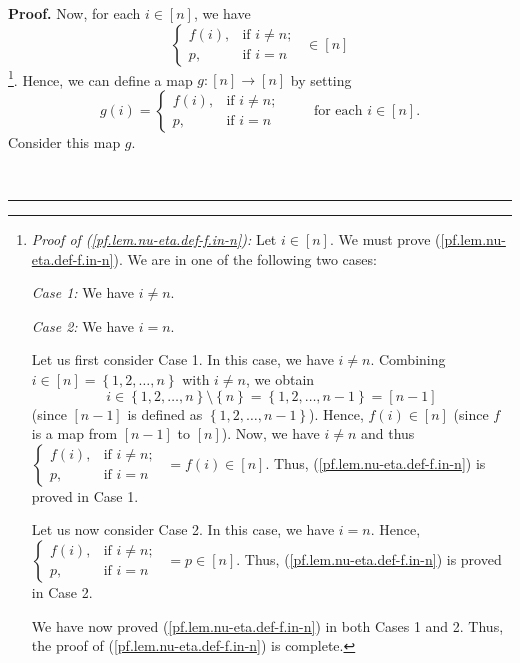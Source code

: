 \documentclass
[numbers=enddot,12pt,final,onecolumn,notitlepage,english]{scrartcl}%
\theoremstyle{definition}
\newenvironment{proof}[1][Proof]{\noindent\textbf{#1.} }{\ \rule{0.5em}{0.5em}}
\newenvironment{verlong}{}{}
\begin{document}
\begin{verlong}
\begin{proof}
Now, for each $i\in\left[  n\right]  $, we have%
\begin{equation}%
\begin{cases}
f\left(  i\right)  , & \text{if }i\neq n;\\
p, & \text{if }i=n
\end{cases}
\ \ \in\left[  n\right]  \label{pf.lem.nu-eta.def-f.in-n}%
\end{equation}
\footnote{\textit{Proof of (\ref{pf.lem.nu-eta.def-f.in-n}):} Let $i\in\left[
n\right]  $. We must prove (\ref{pf.lem.nu-eta.def-f.in-n}). We are in one of
the following two cases:
\par
\textit{Case 1:} We have $i\neq n$.
\par
\textit{Case 2:} We have $i=n$.
\par
Let us first consider Case 1. In this case, we have $i\neq n$. Combining
$i\in\left[  n\right]  =\left\{  1,2,\ldots,n\right\}  $ with $i\neq n$, we
obtain%
\[
i\in\left\{  1,2,\ldots,n\right\}  \setminus\left\{  n\right\}  =\left\{
1,2,\ldots,n-1\right\}  =\left[  n-1\right]
\]
(since $\left[  n-1\right]  $ is defined as $\left\{  1,2,\ldots,n-1\right\}
$). Hence, $f\left(  i\right)  \in\left[  n\right]  $ (since $f$ is a map from
$\left[  n-1\right]  $ to $\left[  n\right]  $). Now, we have $i\neq n$ and
thus $%
\begin{cases}
f\left(  i\right)  , & \text{if }i\neq n;\\
p, & \text{if }i=n
\end{cases}
\ \ =f\left(  i\right)  \in\left[  n\right]  $. Thus,
(\ref{pf.lem.nu-eta.def-f.in-n}) is proved in Case 1.
\par
Let us now consider Case 2. In this case, we have $i=n$. Hence, $%
\begin{cases}
f\left(  i\right)  , & \text{if }i\neq n;\\
p, & \text{if }i=n
\end{cases}
\ \ =p\in\left[  n\right]  $. Thus, (\ref{pf.lem.nu-eta.def-f.in-n}) is proved
in Case 2.
\par
We have now proved (\ref{pf.lem.nu-eta.def-f.in-n}) in both Cases 1 and 2.
Thus, the proof of (\ref{pf.lem.nu-eta.def-f.in-n}) is complete.}. Hence, we
can define a map $g:\left[  n\right]  \rightarrow\left[  n\right]  $ by
setting%
\[
g\left(  i\right)  =%
\begin{cases}
f\left(  i\right)  , & \text{if }i\neq n;\\
p, & \text{if }i=n
\end{cases}
\ \ \ \ \ \ \ \ \ \ \text{for each }i\in\left[  n\right]  .
\]
Consider this map $g$.


\end{proof}
\end{verlong}
\end{document}
